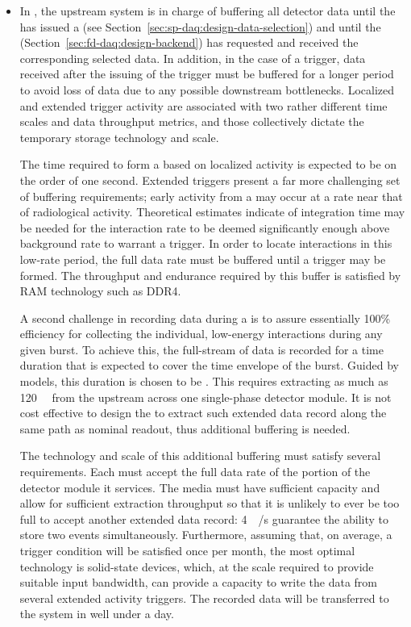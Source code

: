 \begin{itemize}
\item In , the upstream  system is in charge of buffering all
detector data until the  has issued a 
(see Section~\ref{sec:sp-daq:design-data-selection}) and until the
 (Section~\ref{sec:fd-daq:design-backend}) has requested
and received the corresponding selected data. 
In addition, in the case of a  trigger, data received after
the issuing of the trigger must be buffered for a longer period to
avoid loss of data due to any possible downstream
bottlenecks. Localized and extended trigger activity are associated
with two rather different time scales and data throughput metrics, and
those collectively dictate the temporary storage technology and scale. 

The time required to form a  based on localized
activity is expected to be on the order of one second.
Extended triggers present a far more challenging set of buffering
requirements; 
early activity from a  may occur at a rate near that of radiological activity.
Theoretical estimates indicate \snbpretime of integration time may be needed for the
 interaction rate to be deemed significantly enough above
background rate to warrant a trigger.
In order to locate interactions in this low-rate period, the full data rate must be buffered until a  trigger may be formed.
The throughput and endurance required by this buffer is satisfied by RAM technology such as DDR4.

A second challenge in recording data during a  is to assure
essentially 100\% efficiency for collecting the individual, low-energy
interactions during any given  burst. 
To achieve this, the full-stream of data is recorded for a time duration that is expected to cover the time envelope of the burst.
Guided by  models, this duration is chosen to be \snbtime.
This requires extracting as much as \SI{120}{\tera\byte} from the  upstream  across one single-phase detector module.
It is not cost effective to design the  to extract such
extended data record along the same path as nominal readout, thus
additional buffering is needed.

The technology and scale of this additional buffering must satisfy several requirements. 
Each  must accept the full data rate of the portion of the detector module it services.
The media must have sufficient capacity and allow for sufficient extraction throughput so that it is unlikely to ever be too full to accept another extended data record: \SI{4}{\tera\bit/\second} guarantee the ability to store two  events simultaneously.
Furthermore, assuming that, on average, a  trigger condition will be
satisfied once per month, the most optimal technology is
solid-state  devices, which, at the scale required to provide suitable input bandwidth, can provide a capacity to write the data from several extended activity triggers. The recorded data will be transferred to the  system in well under a day.


\end{itemize}

